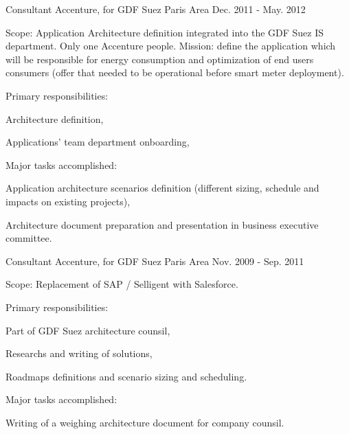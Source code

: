 \begin{cventries}
  \cventry
    {Consultant} %
    {Accenture, for GDF Suez} %
    {Paris Area} %
    {Dec. 2011 - May. 2012} %
    {
      \begin{cvitems} %
        \item {Scope: Application Architecture definition integrated into the GDF Suez IS department. Only one Accenture people. Mission: define the application which will be responsible for energy consumption and optimization of end users consumers (offer that needed to be operational before smart meter deployment).}
        \item {Primary responsibilities:}
        \begin{cvsubitems}
          \item {Architecture definition,}
          \item {Applications' team department onboarding,}
        \end{cvsubitems}
        \item {Major tasks accomplished:}
        \begin{cvsubitems}
          \item {Application architecture scenarios definition (different sizing, schedule and impacts on existing projects),}
          \item {Architecture document preparation and presentation in business executive committee.}
        \end{cvsubitems}
      \end{cvitems}
    }

  \cventry
    {Consultant} %
    {Accenture, for GDF Suez} %
    {Paris Area} %
    {Nov. 2009 - Sep. 2011} %
    {
      \begin{cvitems} %
        \item {Scope: Replacement of SAP / Selligent with Salesforce.}
        \item {Primary responsibilities:}
        \begin{cvsubitems}
          \item {Part of GDF Suez architecture counsil,}
          \item {Researchs and writing of solutions,}
          \item {Roadmaps definitions and scenario sizing and scheduling.}
        \end{cvsubitems}
        \item {Major tasks accomplished:}
        \begin{cvsubitems}
          \item {Writing of a weighing architecture document for company counsil.}
        \end{cvsubitems}
      \end{cvitems}
    }


\end{cventries}
